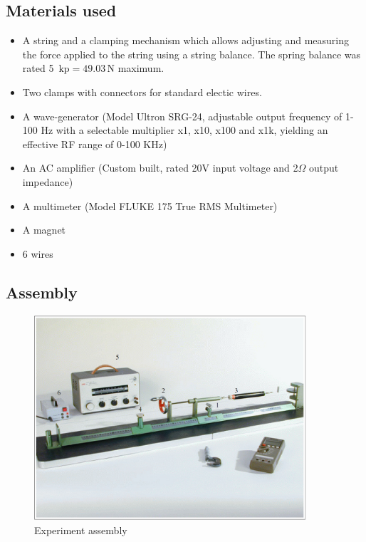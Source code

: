 \documentclass{scrreprt}
\newcommand{\unit}[1]{\ensuremath{\, \mathrm{#1}}}
\begin{document}
\subsection{Materials used}
\begin{itemize}
  \item A string and a clamping mechanism which allows adjusting and measuring the force applied to the string using a string balance. The spring balance was rated 5 $\unit{kp} = 49.03\unit{N}$ maximum.
  \item Two clamps with connectors for standard electic wires.
  \item A wave-generator (Model Ultron SRG-24, adjustable output frequency of 1-100 Hz with a selectable multiplier x1, x10, x100 and x1k, yielding an effective RF range of 0-100 KHz)
  \item An AC amplifier (Custom built, rated 20V input voltage and 2$\Omega$ output impedance)
  \item A multimeter (Model FLUKE 175 True RMS Multimeter)
  \item A magnet
  \item 6 wires
\end{itemize}

\subsection{Assembly}

\begin{figure}[H]
\center
\includegraphics[width=0.9\textwidth]{img/WaveSetup.PNG}
\caption{Experiment assembly}
\end{figure}
\end{document}
